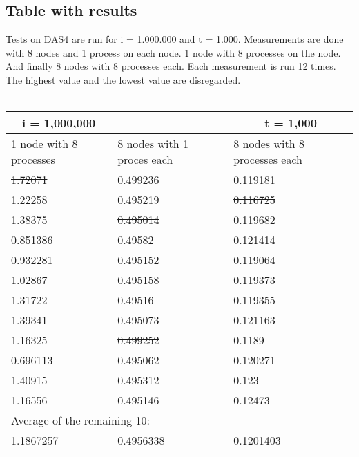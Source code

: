 \documentclass[a4paper]{article}
\begin{document}
  \subsection{Table with results}
    Tests on DAS4 are run for i = 1.000.000 and t = 1.000.
    Measurements are done with 8 nodes and 1 process on each node. 1 node with
    8 processes on the node. And finally 8 nodes with 8 processes each.
    Each measurement is run 12 times. 
    The highest value and the lowest value are disregarded. \\\\
    \begin{tabular}{| p{} | p{} | p{} |}
      \hline
      \multicolumn{1}{|c}{i = 1,000,000} & \multicolumn{1}{c}{} & \multicolumn{1}{c|}{t = 1,000}\\
      \hline
      1 node with 8 processes & 8 nodes with 1 proces each & 8 nodes with 8 processes each\\
      \hline
      \st{1.72071} & 0.499236 & 0.119181\\
      \hline
      1.22258 & 0.495219 & \st{0.116725}\\
      \hline
      1.38375 & \st{0.495014} & 0.119682\\
      \hline
      0.851386 & 0.49582 & 0.121414\\
      \hline
      0.932281 & 0.495152 & 0.119064\\
      \hline
      1.02867 & 0.495158 & 0.119373\\
      \hline
      1.31722 & 0.49516 & 0.119355\\
      \hline
      1.39341 & 0.495073 & 0.121163\\
      \hline
      1.16325 & \st{0.499252} & 0.1189\\
      \hline
      \st{0.696113} & 0.495062 & 0.120271\\
      \hline
      1.40915 & 0.495312 & 0.123\\
      \hline
      1.16556 & 0.495146 & \st{0.12473}\\
      \hline
      \multicolumn{3}{|l|}{Average of the remaining 10:}\\
      \hline
      1.1867257 & 0.4956338 & 0.1201403\\
      \hline
    \end{tabular}
\end{document}
